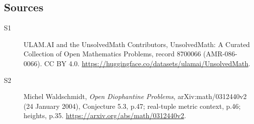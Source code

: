\documentclass[11pt]{article}
\begin{document}
\subsection{Sources}
\begin{description}
\item[\hypertarget{source:8700066:1}{S1}] ULAM.AI and the UnsolvedMath Contributors, UnsolvedMath: A Curated Collection of Open Mathematics Problems, record 8700066 (AMR-086-0066). CC BY 4.0. \url{https://huggingface.co/datasets/ulamai/UnsolvedMath}.
\item[\hypertarget{source:8700066:2}{S2}] Michel Waldschmidt, \emph{Open Diophantine Problems}, arXiv:math/0312440v2 (24 January 2004), Conjecture 5.3, p.47; real-tuple metric context, p.46; heights, p.35. \url{https://arxiv.org/abs/math/0312440v2}.
\end{description}
\label{end:8700066}
\end{document}
